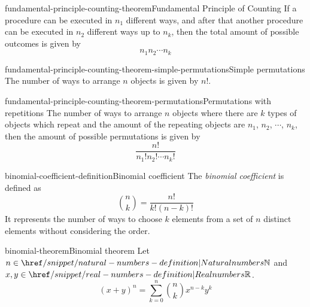 \documentclass[preview]{standalone}
\begin{document}
\genpage

\begin{snippettheorem}{fundamental-principle-counting-theorem}{Fundamental Principle of Counting}
    If a procedure can be executed in \(n_1\) different ways, and after that
    another procedure can be executed in \(n_2\) different ways
    up to \(n_k\), then the total amount of possible outcomes is given by
    \[
        n_1n_2\cdots n_k
    \]
\end{snippettheorem}

\begin{snippetcorollary}{fundamental-principle-counting-theorem-simple-permutations}{Simple permutations}
    The number of ways to arrange \(n\) objects is given by \(n!\).
\end{snippetcorollary}

\begin{snippetcorollary}{fundamental-principle-counting-theorem-permutations}{Permutations with repetitions}
    The number of ways to arrange \(n\) objects where there are
    \(k\) types of objects which repeat and the amount of the repeating objects
    are \(n_1\), \(n_2\), \(\cdots\), \(n_k\), then the amount of possible permutations is
    given by
    \[
        \frac{n!}{n_1!n_2!\cdots n_k!}
    \]
\end{snippetcorollary}



\begin{snippetdefinition}{binomial-coefficient-definition}{Binomial coefficient}
    The \textit{binomial coefficient} is defined as
    \[
        \binom{n}{k} = \frac{n!}{k!(n-k)!}
    \]
    It represents the number of ways to choose $k$ elements from a set of $n$ distinct
    elements without considering the order.
\end{snippetdefinition}


\begin{snippettheorem}{binomial-theorem}{Binomial theorem}
    Let \(n \in \naturalnumbers\) and \(x,y \in \realnumbers\).
    \[
        {(x+y)}^n = \sum_{k=0}^n \binom{n}{k} x^{n-k}y^k
    \]
\end{snippettheorem}

\end{document}
